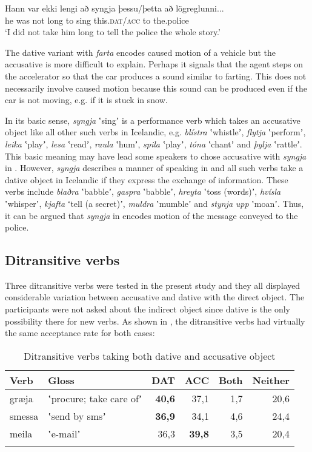\documentclass[output=paper,modfonts,nonflat]{langsci/langscibook}
\begin{document}
\ex  \label{ex:jonsson:8b}
\gll   Hann  var  ekki  lengi  að  syngja  þessu/þetta  að  lögreglunni...  \\
 he  was  not  long  to  sing  this.\textsc{dat/acc}  to  the.police  \\
\glt `I did not take him long to tell the police the whole story.'
\z
\z

The dative variant with \textit{farta} encodes caused motion of a vehicle but the accusative is more difficult to explain. Perhaps it signals that the agent steps on the accelerator so that the car produces a sound similar to farting. This does not necessarily involve caused motion because this sound can be produced even if the car is not moving, e.g. if it is stuck in snow. 

In its basic sense, \textit{syngja} ʽsingʼ is a performance verb which takes an accusative object like all other such verbs in Icelandic, e.g. \textit{blístra} ʽwhistleʼ, \textit{flytja} ʽperformʼ, \textit{leika} ʽplayʼ, \textit{lesa} ʽreadʼ, \textit{raula} ʽhumʼ, \textit{spila} ʽplayʼ, \textit{tóna} ʽchantʼ and \textit{þylja} ʽrattleʼ. This basic meaning may have lead some speakers to chose accusative with \textit{syngja} in . However, \textit{syngja} describes a manner of speaking in  and all such verbs take a dative object in Icelandic if they express the exchange of information. These verbs include \textit{blaðra} ʽbabbleʼ,  \textit{gaspra} ʽbabbleʼ, \textit{hreyta} ʽtoss (words)ʼ, \textit{hvísla} ʽwhisperʼ, \textit{kjafta} ʻtell (a secret)ʼ, \textit{muldra} ʽmumbleʼ and \textit{stynja} \textit{upp} ʽmoanʼ. Thus, it can be argued that \textit{syngja} in  encodes motion of the message conveyed to the police. 

\subsection{Ditransitive verbs} %

Three ditransitive verbs were tested in the present study and they all displayed considerable variation between accusative and dative with the direct object. The participants were not asked about the indirect object since dative is the only possibility there for new verbs. As shown in , the ditransitive verbs had virtually the same acceptance rate for both cases:

\begin{table}
{\caption{\label{tab:jonsson:5}Ditransitive verbs taking both dative and accusative object}}
\begin{tabularx}{\textwidth}{XXrrrr}
\lsptoprule
Verb & Gloss & DAT & ACC & Both & Neither\\
\midrule
græja & ʽprocure; take care ofʼ & \textbf{40,6} & 37,1 & 1,7 & 20,6\\
smessa & ʽsend by smsʼ & \textbf{36,9} & 34,1 & 4,6 & 24,4\\
meila & ʽe-mailʼ & 36,3 & \textbf{39,8} & 3,5 & 20,4\\
\lspbottomrule
\end{tabularx}
\end{table}
\end{document}
